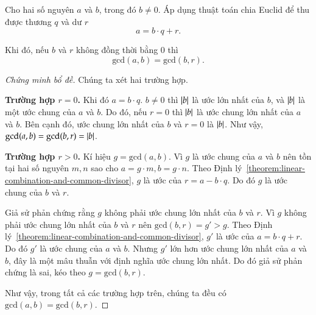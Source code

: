 \begin{lemma}
	Cho hai số nguyên $a$ và $b$, trong đó $b\ne 0$. Áp dụng thuật toán chia Euclid để thu được thương $q$ và dư $r$
	\[
		a = b\cdot q + r.
	\]

	\noindent Khi đó, nếu $b$ và $r$ không đồng thời bằng $0$ thì
	\[
		\text{gcd}(a, b) = \text{gcd}(b, r).
	\]
\end{lemma}

\begin{proof}[Chứng minh bổ đề]
	Chúng ta xét hai trường hợp.

	\textbf{Trường hợp $r = 0$.} Khi đó $a = b\cdot q$. $b\ne 0$ thì $\left\vert{b}\right\vert$ là ước lớn nhất của $b$, và $\left\vert{b}\right\vert$ là một ước chung của $a$ và $b$. Do đó, nếu $r = 0$ thì $\left\vert{b}\right\vert$ là ước chung lớn nhất của $a$ và $b$. Bên cạnh đó, ước chung lớn nhất của $b$ và $r = 0$ là $\left\vert{b}\right\vert$. Như vậy, $\text{gcd}(a, b) = \text{gcd}(b, r) = \left\vert{b}\right\vert$.

	\textbf{Trường hợp $r > 0$.} Kí hiệu $g = \text{gcd}(a, b)$. Vì $g$ là ước chung của $a$ và $b$ nên tồn tại hai số nguyên $m, n$ sao cho $a = g\cdot m, b = g\cdot n$. Theo Định lý~\ref{theorem:linear-combination-and-common-divisor}, $g$ là ước của $r = a - b\cdot q$. Do đó $g$ là ước chung của $b$ và $r$.

	Giả sử phản chứng rằng $g$ không phải ước chung lớn nhất của $b$ và $r$. Vì $g$ không phải ước chung lớn nhất của $b$ và $r$ nên $\text{gcd}(b, r) = g' > g$. Theo Định lý~\ref{theorem:linear-combination-and-common-divisor}, $g'$ là ước của $a = b\cdot q + r$.  Do đó $g'$ là ước chung của $a$ và $b$. Nhưng $g'$ lớn hơn ước chung lớn nhất của $a$ và $b$, đây là một mâu thuẫn với định nghĩa ước chung lớn nhất. Do đó giả sử phản chứng là sai, kéo theo $g = \text{gcd}(b, r)$.

	Như vậy, trong tất cả các trường hợp trên, chúng ta đều có $\text{gcd}(a, b) = \text{gcd}(b, r)$.
\end{proof}

